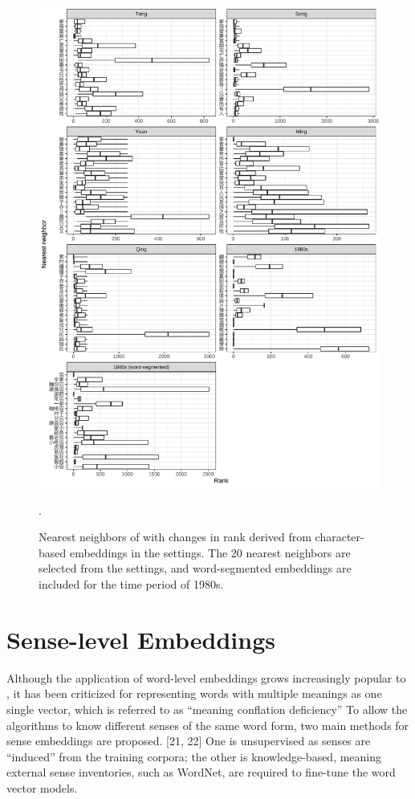 \newpage
\begin{figure}[H]
  \centering
  \includegraphics[height=0.85\textheight,keepaspectratio]{figures_new/bootstrap_for_stability/neighbor_rank_change.pdf}
  \caption{Nearest neighbors of \jia with changes in rank derived from character-based embeddings in the  settings. The 20 nearest neighbors are selected from the  settings, and word-segmented embeddings are included for the time period of 1980s.} \label{fig:bootstrap_rank}.
\end{figure}

\section{Sense-level Embeddings}
Although the application of word-level embeddings grows increasingly popular to , it has been criticized for representing words with multiple meanings as one single vector, which is referred to as ``meaning conflation deficiency'' \parencite{camacho2018survey} To allow the algorithms to know different senses of the same word form, two main methods for sense embeddings are proposed. [21, 22] One is unsupervised as senses are ``induced'' from the training corpora; the other is knowledge-based, meaning external sense inventories, such as WordNet, are required to fine-tune the word vector models.

